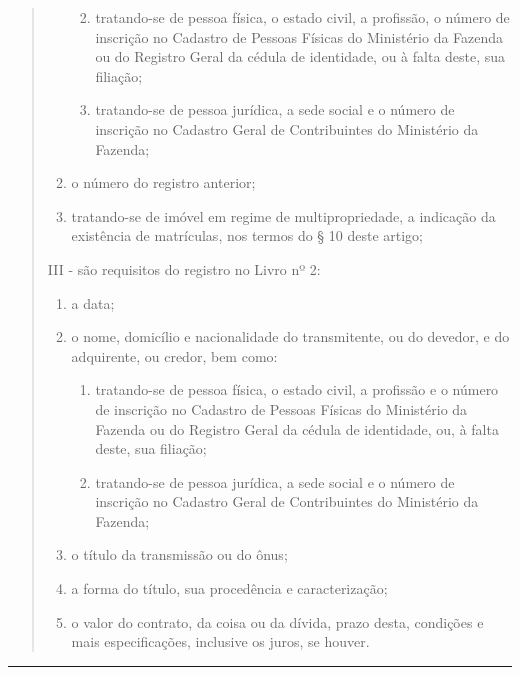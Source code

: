 \documentclass[
  letterpaper,
]{report}
\providecommand{\tightlist}{%
  \setlength{\itemsep}{0pt}\setlength{\parskip}{0pt}}\usepackage{longtable,booktabs,array}
\begin{document}
\begin{quote}
\begin{enumerate}
  \begin{enumerate}
  \def\labelenumii{\alph{enumii})}
  \tightlist
  \item
    tratando-se de pessoa física, o estado civil, a profissão, o número
    de inscrição no Cadastro de Pessoas Físicas do Ministério da Fazenda
    ou do Registro Geral da cédula de identidade, ou à falta deste, sua
    filiação;
  \item
    tratando-se de pessoa jurídica, a sede social e o número de
    inscrição no Cadastro Geral de Contribuintes do Ministério da
    Fazenda;
  \end{enumerate}
\item
  o número do registro anterior;
\item
  tratando-se de imóvel em regime de multipropriedade, a indicação da
  existência de matrículas, nos termos do § 10 deste artigo;
\end{enumerate}

III - são requisitos do registro no Livro nº 2:

\begin{enumerate}
\def\labelenumi{\arabic{enumi})}
\item
  a data;
\item
  o nome, domicílio e nacionalidade do transmitente, ou do devedor, e do
  adquirente, ou credor, bem como:

  \begin{enumerate}
  \def\labelenumii{\alph{enumii})}
  \tightlist
  \item
    tratando-se de pessoa física, o estado civil, a profissão e o número
    de inscrição no Cadastro de Pessoas Físicas do Ministério da Fazenda
    ou do Registro Geral da cédula de identidade, ou, à falta deste, sua
    filiação;
  \item
    tratando-se de pessoa jurídica, a sede social e o número de
    inscrição no Cadastro Geral de Contribuintes do Ministério da
    Fazenda;
  \end{enumerate}
\item
  o título da transmissão ou do ônus;
\item
  a forma do título, sua procedência e caracterização;
\item
  o valor do contrato, da coisa ou da dívida, prazo desta, condições e
  mais especificações, inclusive os juros, se houver.
\end{enumerate}
\end{quote}

\begin{center}\rule{0.5\linewidth}{0.5pt}\end{center}
\end{document}
